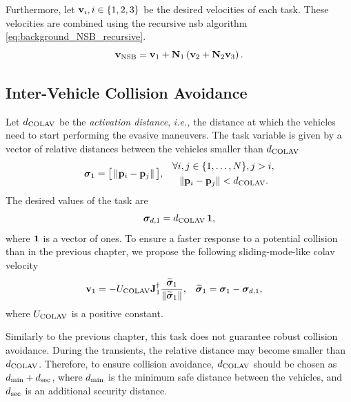 Furthermore, let $\mathbf{v}_i, i \in \left\{1,2,3\right\}$ be the desired velocities of each task.    
These velocities are combined using the recursive \gls{nsb} algorithm \eqref{eq:background_NSB_recursive}.
\begin{equation} 
    \mathbf{v}_{\rm NSB} = \mathbf{v}_1 + \mathbf{N}_1\left(\mathbf{v}_2 + \mathbf{N}_2\mathbf{v}_3\right). \label{eq:NSB_R_NSB_with_COLAV}
\end{equation}

\subsection{Inter-Vehicle Collision Avoidance}
\label{sec:NSB_R_COLAV}

Let {$d_{\rm COLAV}$} be the \emph{activation distance}, \emph{i.e.,} the distance at which the vehicles need to start performing the evasive maneuvers.
The task variable is given by a vector of relative distances between the vehicles smaller than $d_{\rm COLAV}$
\begin{align}
        \bm{\sigma}_1 &= \big[\left\|\mathbf{p}_i - \mathbf{p}_j\right\|\big], &
        \begin{split} 
            \forall &i,j\in\{1,\ldots,N\}, j > i, \\
            &\left\|\mathbf{p}_i - \mathbf{p}_j\right\| < d_{\rm COLAV}.
        \end{split}
\end{align}
The desired values of the task are 
\begin{equation}
    \bm{\sigma}_{d,1} = d_{\rm COLAV} \, \mathbf{1},
\end{equation}
where $\mathbf{1}$ is a vector of ones.
To ensure a faster response to a potential collision than in the previous chapter, we propose the following sliding-mode-like \gls{colav} velocity 
\begin{align}
    \mathbf{v}_1 &= - U_{\rm COLAV} \mathbf{J}_1^{\dagger} \frac{\widetilde{\bm{\sigma}}_1}{\left\|\widetilde{\bm{\sigma}}_1\right\|}, &
    \widetilde{\bm{\sigma}}_1 &= \bm{\sigma}_1 - \bm{\sigma}_{d, 1},
\end{align}
where $U_{\rm COLAV}$ is a positive constant.

Similarly to the previous chapter, this task does not guarantee robust collision avoidance.
During the transients, the relative distance may become smaller than $d_{\rm COLAV}$.
Therefore, to ensure collision avoidance, $d_{\rm COLAV}$ should be chosen as $d_{\rm min} + d_{\rm sec}$, where $d_{\rm min}$ is the minimum safe distance between the vehicles, and $d_{\rm sec}$ is an additional security distance.

